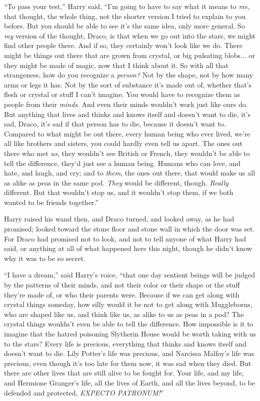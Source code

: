 ``To pass your test,'' Harry said, ``I'm going to have to say what it means to \emph{me,} that thought, the whole thing, not the shorter version I tried to explain to you before. But you should be able to see it's the same idea, only more general. So \emph{my} version of the thought, Draco, is that when we go out into the stars, we might find other people there. And if so, they certainly won't look like we do. There might be things out there that are grown from crystal, or big pulsating blobs... or they might be made of magic, now that I think about it. So with all that strangeness, how do you recognize a \emph{person?} Not by the shape, not by how many arms or legs it has. Not by the sort of substance it's made out of, whether that's flesh or crystal or stuff I can't imagine. You would have to recognize them as people from their \emph{minds}. And even their minds wouldn't work just like ours do. But anything that lives and thinks and knows itself and doesn't want to die, it's sad, Draco, it's sad if that person has to die, because it doesn't want to. Compared to what might be out there, every human being who ever lived, we're all like brothers and sisters, you could hardly even tell us apart. The ones out there who met \emph{us,} they wouldn't see British or French, they wouldn't be able to tell the difference, they'd just see a human being. Humans who can love, and hate, and laugh, and cry; and to \emph{them}, the ones out there, that would make us all as alike as peas in the same pod. \emph{They} would be different, though. \emph{Really} different. But that wouldn't stop us, and it wouldn't stop them, if we both wanted to be friends together.''

Harry raised his wand then, and Draco turned, and looked away, as he had promised; looked toward the stone floor and stone wall in which the door was set. For Draco had promised not to look, and not to tell anyone of what Harry had said, or anything at all of what happened here this night, though he didn't know why it was to be so secret.

``I have a dream,'' said Harry's voice, ``that one day sentient beings will be judged by the patterns of their minds, and not their color or their shape or the stuff they're made of, or who their parents were. Because if we can get along with crystal things someday, how silly would it be not to get along with Muggleborns, who are shaped like us, and think like us, as alike to us as peas in a pod? The crystal things wouldn't even be able to tell the difference. How impossible is it to imagine that the hatred poisoning Slytherin House would be worth taking with us to the stars? Every life is precious, everything that thinks and knows itself and doesn't want to die. Lily Potter's life was precious, and Narcissa Malfoy's life was precious, even though it's too late for them now, it was sad when they died. But there are other lives that are still alive to be fought for. Your life, and my life, and Hermione Granger's life, all the lives of Earth, and all the lives beyond, to be defended and protected, \emph{EXPECTO PATRONUM!}''

